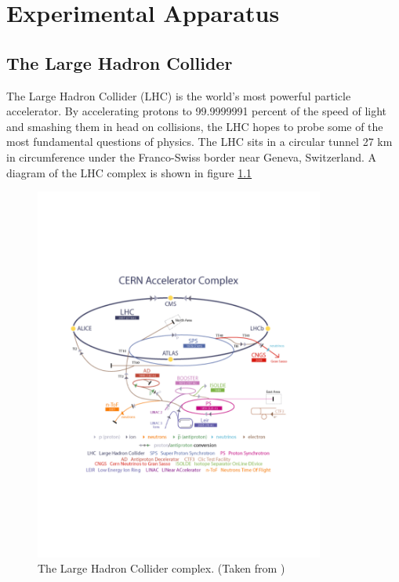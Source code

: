 \chapter{Experimental Apparatus}
\label{chap:Exp}

\section{The Large Hadron Collider}
\indent The Large Hadron Collider (LHC) is the world's most powerful particle accelerator. By accelerating protons to 99.9999991 percent of the speed of light and smashing them in head on collisions, the LHC hopes to probe some of the most fundamental questions of physics. The LHC sits in a circular tunnel 27 km in circumference under the Franco-Swiss border near Geneva, Switzerland. A diagram of the LHC complex is shown in figure \ref{LHC:fig:LHCComplex} ~\\
\begin{figure}[h!]
\centering
\includegraphics[width=0.85\textwidth, angle=270]{figures/DET/AccComplex0700829.pdf}
\caption{ The Large Hadron Collider complex. (Taken from \cite{biblio:LHCpublic}) \label{LHC:fig:LHCComplex}}
\end{figure}

